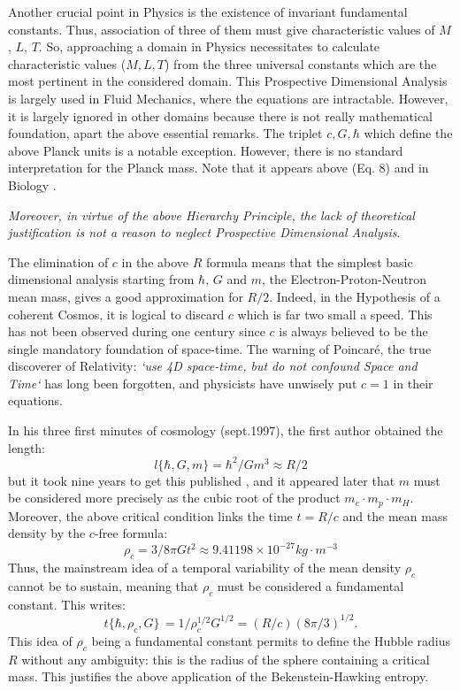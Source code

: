 \documentclass[twoside,draft]{article}
\begin{document}
\begin{sloppypar}
Another crucial point in Physics is the existence of invariant fundamental constants. Thus, association of three of them must give characteristic values of $M$, $L$, $T$. So, approaching a domain in Physics necessitates to calculate characteristic values ($M, L, T$) from the three universal constants which are the most pertinent in the considered domain. This Prospective Dimensional Analysis is largely used in Fluid Mechanics, where the equations are intractable. However, it is largely ignored in other domains because there is not really mathematical foundation, apart the above essential remarks. The triplet $c, G, \hbar$ which define the above Planck units is a notable exception. However, there is no standard interpretation for the Planck mass. Note that  it appears above (Eq. 8) and in Biology \cite{Sanchez1}. 

\textit{Moreover, in virtue of the above Hierarchy Principle, the lack of theoretical justification is not a reason to neglect Prospective Dimensional Analysis}. 

The elimination of $c$ in the above $R$ formula means that the simplest basic dimensional
analysis starting from $\hbar$, $G$ and $m$, the Electron-Proton-Neutron mean mass, gives a good
approximation for $R/2$. Indeed, in the Hypothesis of a coherent Cosmos, it is logical to discard $c$
which is far two small a speed. This has not been observed during one century since $c$ is always
believed to be the single mandatory foundation of space-time. The warning of Poincar\'{e}\cite{Sanchez1}, the true
discoverer of Relativity: \textit{`use 4D space-time, but do not confound Space and Time`} has long been
forgotten, and physicists have unwisely put $c = 1$ in their equations.

In his three first minutes of cosmology (sept.1997), the first author obtained the length:
\begin{equation}
l \{\hbar,G,m\} = \hbar^{2} /Gm^{3} \approx R/2
\end{equation}
but it took nine years to get this published \cite{Sanchez3}, and it appeared later \cite{Sanchez1} that $m$ must be considered more precisely as the cubic root of the product 
$ m_{e} \cdot m_{p} \cdot m_{H}$. Moreover, the above critical condition
links the time $t = R/c$ and the mean mass density by the $c$-free formula:
\begin{equation}
\rho_{c} = 3/8\pi Gt^{2} \approx 9.41198 \times 10^{-27} kg \cdot m^{-3}
\end{equation}
Thus, the mainstream idea of a temporal variability of the mean density $\rho_{c}$ cannot be to
sustain, meaning that $\rho_{c}$ must be considered a fundamental constant. This writes:
\begin{equation}
t\{\hbar,\rho_{c} ,G\}\, = 1/\rho_{c}^{1/2} G^{1/2} = (R/c) (8\pi/3)^{1/2}.
\end{equation}
This idea of $\rho_{c}$ being a fundamental constant permits to define the Hubble radius $R$ without any ambiguity: this is the 
radius of the sphere containing a critical mass. This justifies the above application of the Bekenstein-Hawking entropy. 


\end{sloppypar}
\end{document}
